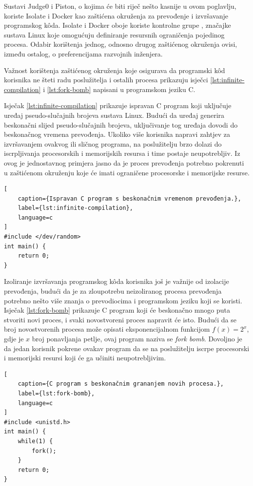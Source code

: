 \documentclass[times, utf8, diplomski]{fer}
\begin{document}
Sustavi Judge0 i Piston, o kojima će biti riječ nešto kasnije u ovom poglavlju, koriste Isolate \citep{marevs2012new} i Docker \citep{merkel2014docker} kao zaštićena okruženja za prevođenje i izvršavanje programskog kôda. Isolate i Docker oboje koriste kontrolne grupe , značajke sustava Linux koje omogućuju definiranje resursnih ograničenja pojedinog procesa. Odabir korištenja jednog, odnosno drugog zaštićenog okruženja ovisi, između ostalog, o preferencijama razvojnih inženjera.

Važnost korištenja zaštićenog okruženja koje osigurava da programski kôd korisnika ne šteti radu poslužitelja i ostalih procesa prikazuju isječci \ref{lst:infinite-compilation} i \ref{lst:fork-bomb} napisani u programskom jeziku C. 

Isječak \ref{lst:infinite-compilation} prikazuje ispravan C program koji uključuje uređaj pseudo-slučajnih brojeva sustava Linux. Budući da uređaj generira beskonačni slijed pseudo-slučajnih brojeva, uključivanje tog uređaja dovodi do beskonačnog vremena prevođenja. Ukoliko više korisnika napravi zahtjev za izvršavanjem ovakvog ili sličnog programa, na poslužitelju brzo dolazi do iscrpljivanja procesorskih i memorijskih resursa i time postaje neupotrebljiv. Iz ovog je jednostavnog primjera jasno da je proces prevođenja potrebno pokrenuti u zaštićenom okruženju koje će imati ograničene procesorske i memorijske resurse.

\begin{lstlisting}[
    caption={Ispravan C program s beskonačnim vremenom prevođenja.},
    label={lst:infinite-compilation},
    language=c
]
#include </dev/random>
int main() {
    return 0;
}
\end{lstlisting}

Izoliranje izvršavanja programskog kôda korisnika još je važnije od izolacije prevođenja, budući da je za zloupotrebu neizoliranog procesa prevođenja potrebno nešto više znanja o prevodiocima i programskom jeziku koji se koristi. Isječak \ref{lst:fork-bomb} prikazuje C program koji će beskonačno mnogo puta stvoriti novi proces, i svaki novostvoreni proces napravit će isto. Budući da se broj novostvorenih procesa može opisati eksponencijalnom funkcijom $f(x) = 2^x$, gdje je $x$ broj ponavljanja petlje, ovaj program naziva se \textit{fork bomb}. Dovoljno je da jedan korisnik pokrene ovakav program da se na poslužitelju iscrpe procesorski i memorijski resursi koji će ga učiniti neupotrebljivim.

\begin{lstlisting}[
    caption={C program s beskonačnim grananjem novih procesa.},
    label={lst:fork-bomb},
    language=c
]
#include <unistd.h>
int main() {
    while(1) {
        fork();
    }
    return 0;
}
\end{lstlisting}
\end{document}
